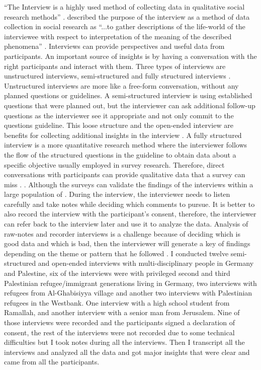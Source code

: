 “The Interview is a highly used method of collecting data in qualitative social research methods” \citep{Anyan2013}. \cite{Kvale1983} described the purpose of the interview as a method of data collection in social research as “...to gather descriptions of the life-world of the interviewee with respect to interpretation of the meaning of the described phenomena” \cite[p.174]{Kvale1983}. Interviews can provide perspectives and useful data from participants. An important source of insights is by having a conversation with the right participants and interact with them. 
Three types of interviews are unstructured interviews, semi-structured and fully structured interviews \citep{Lazar2017ResearchInteraction}. Unstructured interviews are more like a free-form conversation, without any planned questions or guidelines. A semi-structured interview is using established questions that were planned out, but the interviewer can ask additional follow-up questions as the interviewer see it appropriate and not only commit to the questions guideline. This loose structure and the open-ended interview are benefits for collecting additional insights in the interview \citep{Pannafino2017UXMethods}. A fully structured interview is a more quantitative research method where the interviewer follows the flow of the structured questions in the guideline to obtain data about a specific objective usually employed in survey research. Therefore, direct conversations with participants can provide qualitative data that a survey can miss \citep{Lazar2017ResearchInteraction}.  \cite [p.187]{Lazar2017ResearchInteraction}. Although the surveys can validate the findings of the interviews within a large population of \citep{Pannafino2017UXMethods}. During the interview, the interviewer needs to listen carefully and take notes while deciding which comments to pursue. It is better to also record the interview with the participant's consent, therefore, the interviewer can refer back to the interview later and use it to analyze the data. Analysis of raw-notes and recorder interviews is a challenge because of deciding which is good data and which is bad, then the interviewer will generate a key of findings depending on the theme or pattern that he followed \citep{Lazar2017ResearchInteraction, Pannafino2017UXMethods}.
I conducted twelve semi-structured and open-ended interviews with multi-disciplinary people in Germany and Palestine, six of the interviews were with privileged second and third Palestinian refugee/immigrant generations living in Germany, two interviews with refugees from Al-Ghabisiyya village and another two interviews with Palestinian refugees in the Westbank. One interview with a high school student from Ramallah, and another interview with a senior man from Jerusalem. Nine of those interviews were recorded and the participants signed a declaration of consent, the rest of the interviews were not recorded due to some technical difficulties but I took notes during all the interviews. Then I transcript all the interviews and analyzed all the data and got major insights that were clear and came from all the participants.           

